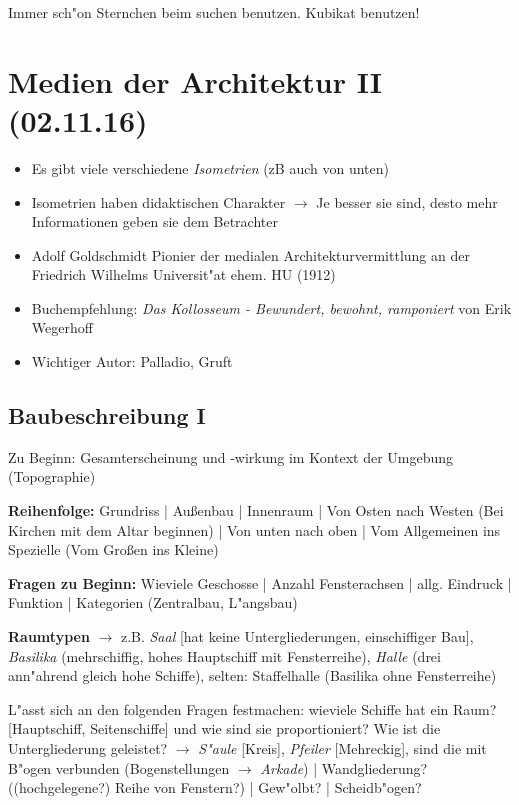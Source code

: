 \documentclass[]{scrartcl}
\begin{document}
Immer sch"on Sternchen beim suchen benutzen.
Kubikat benutzen!


\section{Medien der Architektur II\\(02.11.16)}

\begin{itemize}
  \item Es gibt viele verschiedene \emph{Isometrien} (zB auch von unten)
  \item Isometrien haben didaktischen Charakter $\rightarrow$ Je besser sie sind, desto mehr Informationen geben sie dem Betrachter
  \item Adolf Goldschmidt Pionier der medialen Architekturvermittlung an der Friedrich Wilhelms Universit"at ehem. HU (1912)
  \item Buchempfehlung: \emph{Das Kollosseum - Bewundert, bewohnt, ramponiert} von Erik Wegerhoff
  \item Wichtiger Autor: Palladio, Gruft
\end{itemize}

\subsection{Baubeschreibung I}

Zu Beginn: Gesamterscheinung und -wirkung im Kontext der Umgebung (Topographie)


\textbf{Reihenfolge:} Grundriss | Au\ss enbau | Innenraum | Von Osten nach Westen (Bei Kirchen mit dem Altar beginnen) | Von unten nach oben | Vom Allgemeinen ins Spezielle (Vom Gro\ss en ins Kleine)

\textbf{Fragen zu Beginn:} Wieviele Geschosse | Anzahl Fensterachsen | allg. Eindruck | Funktion | Kategorien (Zentralbau, L"angsbau) 

\textbf{Raumtypen} $\rightarrow$ z.B. \emph{Saal} [hat keine Untergliederungen, einschiffiger Bau], \emph{Basilika} (mehrschiffig, hohes Hauptschiff mit Fensterreihe), \emph{Halle} (drei ann"ahrend gleich hohe Schiffe), selten: Staffelhalle (Basilika ohne Fensterreihe)

L"asst sich an den folgenden Fragen festmachen: wieviele Schiffe hat ein Raum? [Hauptschiff, Seitenschiffe] und wie sind sie proportioniert? Wie ist die Untergliederung geleistet? $\rightarrow$ \emph{S"aule} [Kreis], \emph{Pfeiler} [Mehreckig], sind die mit B"ogen verbunden (Bogenstellungen $\rightarrow$ \emph{Arkade}) | Wandgliederung? ((hochgelegene?) Reihe von Fenstern?) | Gew"olbt? | Scheidb"ogen? 
\end{document}
